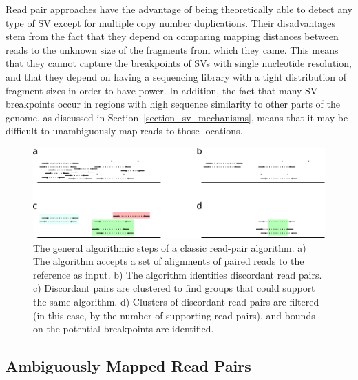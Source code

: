 Read pair approaches have the advantage of being theoretically able to detect any type of SV except for multiple copy number duplications. Their disadvantages stem from the fact that they depend on comparing mapping distances between reads to the unknown size of the fragments from which they came. This means that they cannot capture the breakpoints of SVs with single nucleotide resolution, and that they depend on having a sequencing library with a tight distribution of fragment sizes in order to have power. In addition, the fact that many SV breakpoints occur in regions with high sequence similarity to other parts of the genome, as discussed in Section~\ref{section_sv_mechanisms}, means that it may be difficult to unambiguously map reads to those locations.

\begin{figure}
\centering
\includegraphics[width=\textwidth]{figures/rp_method_workflow.pdf}
\caption[The general algorithmic steps of a classic read-pair algorithm.]{The general algorithmic steps of a classic read-pair algorithm. a) The algorithm accepts a set of alignments of paired reads to the reference as input. b) The algorithm identifies discordant read pairs. c) Discordant pairs are clustered to find groups that could support the same algorithm. d) Clusters of discordant read pairs are filtered (in this case, by the number of supporting read pairs), and bounds on the potential breakpoints are identified.}
\label{rp_method_workflow}
\end{figure}

\subsection{Ambiguously Mapped Read Pairs}

